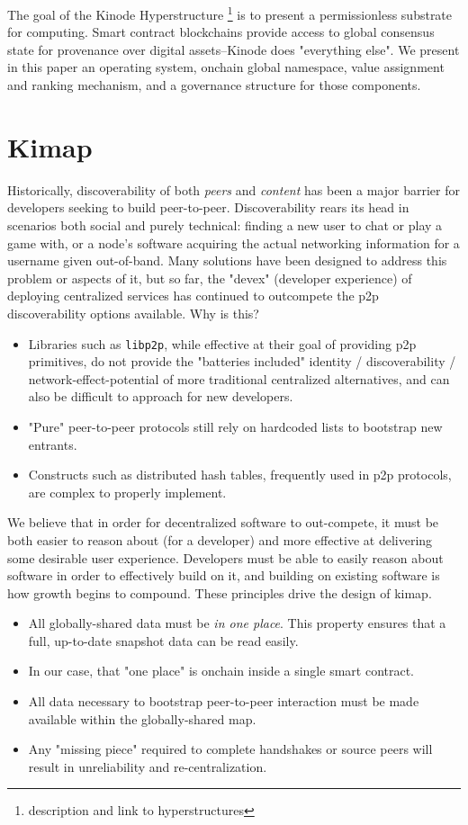 \documentclass[runningheads]{llncs}
\begin{document}
The goal of the Kinode Hyperstructure
\footnote{description and link to hyperstructures}
is to present a permissionless substrate for computing.
Smart contract blockchains provide access to global consensus state for provenance over digital assets–Kinode does "everything else".
We present in this paper an operating system, onchain global namespace, value assignment and ranking mechanism, and a governance structure for those components.


\section{Kimap}

Historically, discoverability of both \textit{peers} and \textit{content} has been a major barrier for developers seeking to build peer-to-peer.
Discoverability rears its head in scenarios both social and purely technical: finding a new user to chat or play a game with, or a node's software acquiring the actual networking information for a username given out-of-band.
Many solutions have been designed to address this problem or aspects of it, but so far, the "devex" (developer experience) of deploying centralized services has continued to outcompete the p2p discoverability options available.
Why is this?
\begin{itemize}
    \item Libraries such as \verb|libp2p|, while effective at their goal of providing p2p primitives, do not provide the "batteries included" identity / discoverability / network-effect-potential of more traditional centralized alternatives, and can also be difficult to approach for new developers.
    \item "Pure" peer-to-peer protocols still rely on hardcoded lists to bootstrap new entrants.
    \item Constructs such as distributed hash tables, frequently used in p2p protocols, are complex to properly implement.
\end{itemize}
We believe that in order for decentralized software to out-compete, it must be both easier to reason about (for a developer) and more effective at delivering some desirable user experience.
Developers must be able to easily reason about software in order to effectively build on it, and building on existing software is how growth begins to compound.
These principles drive the design of kimap.
\begin{itemize}
    \item All globally-shared data must be \textit{in one place}.
    This property ensures that a full, up-to-date snapshot data can be read easily.
    \item In our case, that "one place" is onchain inside a single smart contract.
    \item All data necessary to bootstrap peer-to-peer interaction must be made available within the globally-shared map.
    \item Any "missing piece" required to complete handshakes or source peers will result in unreliability and re-centralization.
\end{itemize}
\end{document}
